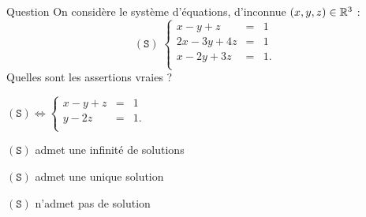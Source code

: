 \begin{multi}[multiple,feedback=
{\[(\mathtt{S}) \Leftrightarrow  \left\{\begin{array}{rcc}
x-y+z&=&1\\
y-2z&=&1\\ 
y-2z&=&0\\
\end{array}\right.  \Leftrightarrow  \left\{\begin{array}{rcc}
x-y+z&=&1\\
y-2z&=&1\\ 
0&=&-1.\\
\end{array}\right.\]
Donc \((\mathtt{S})\) n'admet pas de solution.
}]{Question}
On considère le système d'équations, d'inconnue \((x,y,z)\in \mathbb{R}^3\) :  
\[(\mathtt{S}) \; \left\{\begin{array}{rcc}
x-y+z&=&1\\
2x-3y+4z&=&1\\ 
x-2y+3z&=&1.\\
\end{array}\right.\]
Quelles sont les assertions vraies ?

    \item \((\mathtt{S}) \Leftrightarrow  \left\{\begin{array}{rcc}
x-y+z&=&1\\
y-2z&=&1.\\
\end{array}\right.\)
    \item \((\mathtt{S})\) admet une infinité de solutions
    \item \((\mathtt{S})\) admet une unique solution
    \item* \((\mathtt{S})\) n'admet pas de solution
\end{multi}


